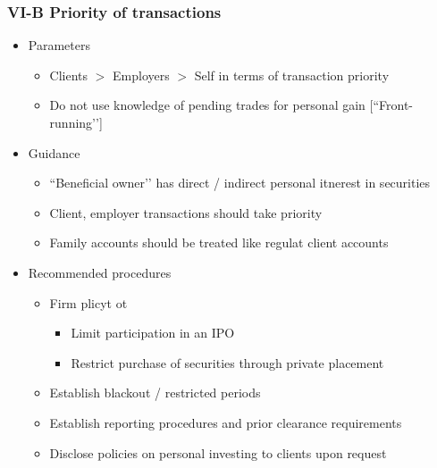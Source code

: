 \documentclass[../notes_compiled.tex]{subfiles}
\begin{document}
\subsubsection{VI-B Priority of transactions}
\begin{itemize}
\item Parameters
\begin{itemize}
\item Clients $>$ Employers $>$ Self in terms of transaction priority
\item Do not use knowledge of pending trades for personal gain [``Front-running’’]
\end{itemize}
\item Guidance
\begin{itemize}
\item ``Beneficial owner’’ has direct / indirect personal itnerest in securities
\item Client, employer transactions should take priority
\item Family accounts should be treated like regulat client accounts
\end{itemize}
\item Recommended procedures
\begin{itemize}
\item Firm plicyt ot
\begin{itemize}
\item Limit participation in an IPO
\item Restrict purchase of securities through private placement
\end{itemize}
\item Establish blackout / restricted periods
\item Establish reporting procedures and  prior clearance requirements
\item Disclose policies on personal investing to clients upon request
\end{itemize}
\end{itemize}
\end{document}
